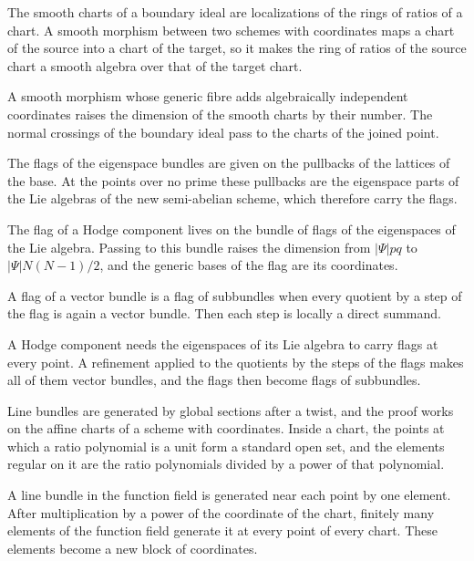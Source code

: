 The smooth charts of a boundary ideal are localizations of the rings of ratios of a chart. A smooth morphism between two schemes
with coordinates maps a chart of the source into a chart of the target, so it makes the ring of ratios of the source chart a
smooth algebra over that of the target chart.

A smooth morphism whose generic fibre adds algebraically independent coordinates raises the dimension of the smooth charts by
their number. The normal crossings of the boundary ideal pass to the charts of the joined point.

The flags of the eigenspace bundles are given on the pullbacks of the lattices of the base. At the points over no prime these
pullbacks are the eigenspace parts of the Lie algebras of the new semi-abelian scheme, which therefore carry the flags.

The flag of a Hodge component lives on the bundle of flags of the eigenspaces of the Lie algebra. Passing to this
bundle raises the dimension from $|\Psi|pq$ to $|\Psi|N(N-1)/2$, and the generic bases of the flag are its
coordinates.

A flag of a vector bundle is a flag of subbundles when every quotient by a step of the flag is again a vector bundle. Then
each step is locally a direct summand.

A Hodge component needs the eigenspaces of its Lie algebra to carry flags at every point. A refinement applied to the
quotients by the steps of the flags makes all of them vector bundles, and the flags then become flags of subbundles.

Line bundles are generated by global sections after a twist, and the proof works on the affine charts of a scheme with
coordinates. Inside a chart, the points at which a ratio polynomial is a unit form a standard open set, and the elements
regular on it are the ratio polynomials divided by a power of that polynomial.

A line bundle in the function field is generated near each point by one element. After multiplication by a power of the
coordinate of the chart, finitely many elements of the function field generate it at every point of every chart. These
elements become a new block of coordinates.

